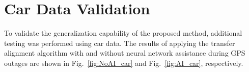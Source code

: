 \documentclass[3p]{elsarticle}
\begin{document}





\newpage
\appendix
\section{Car Data Validation}
\noindent
To validate the generalization capability of the proposed method, additional testing was performed using car data. The results of applying the transfer alignment algorithm with and without neural network assistance during GPS outages are shown in Fig.~\ref{fig:NoAI_car} and Fig.~\ref{fig:AI_car}, respectively.
\begin{figure}[H]
	\centering
	\\
\end{figure}
\end{document}
